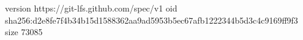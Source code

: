 version https://git-lfs.github.com/spec/v1
oid sha256:d2e8fe7f4b34b15d1588362aa9ad5953b5ec67afb1222344b5d3c4c9169ff9f3
size 73085
